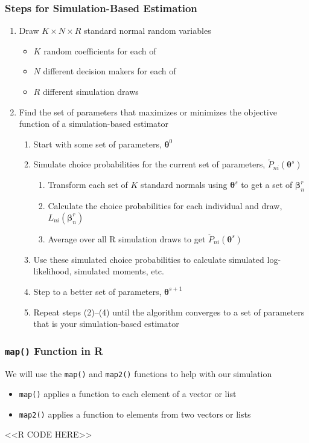\documentclass{beamer}
\begin{document}
\begin{frame}\frametitle{Steps for Simulation-Based Estimation}
    \begin{enumerate}
        \item Draw $K \times N \times R$ standard normal random variables
        \begin{itemize}
            \item $K$ random coefficients for each of
            \item $N$ different decision makers for each of
            \item $R$ different simulation draws
        \end{itemize}
        \item Find the set of parameters that maximizes or minimizes the objective function of a simulation-based estimator
        \begin{enumerate}
            \item Start with some set of parameters, $\bm{\theta}^0$
            \item Simulate choice probabilities for the current set of parameters, $\check{P}_{ni}(\bm{\theta}^s)$
            \begin{enumerate}
                \item Transform each set of $K$ standard normals using $\bm{\theta}^s$ to get a set of $\bm{\beta}_n^r$
                \item Calculate the choice probabilities for each individual and draw, $L_{ni}(\bm{\beta}_n^r)$
                \item Average over all R simulation draws to get $\check{P}_{ni}(\bm{\theta}^s)$
            \end{enumerate}
            \item Use these simulated choice probabilities to calculate simulated log-likelihood, simulated moments, etc.
            \item Step to a better set of parameters, $\bm{\theta}^{s + 1}$
            \item Repeat steps (2)--(4) until the algorithm converges to a set of parameters that is your simulation-based estimator
        \end{enumerate}
    \end{enumerate}
\end{frame}

\begin{frame}[fragile]\frametitle{\texttt{map()} Function in R}
    We will use the \texttt{map()} and \texttt{map2()} functions to help with our simulation
    \begin{itemize}
    	\item \texttt{map()} applies a function to each element of a vector or list
    	\item \texttt{map2()} applies a function to elements from two vectors or lists
    \end{itemize}
    <<R CODE HERE>>
\end{frame}
\end{document}
